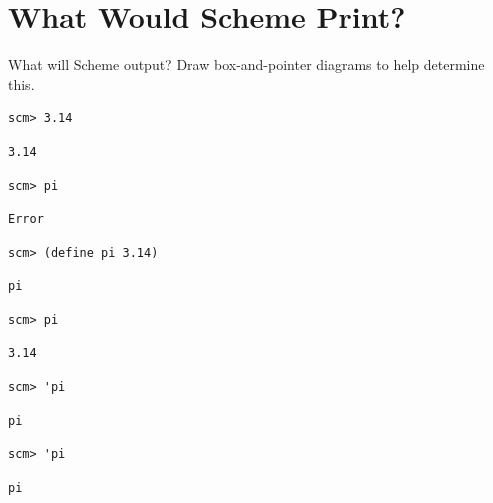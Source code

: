 \documentclass{exam}
\begin{document}
\section{What Would Scheme Print?}
\begin{questions}
\begin{blocksection}
\question What will Scheme output? Draw box-and-pointer diagrams to help determine this.

\begin{lstlisting}
scm> 3.14
\end{lstlisting}
\begin{solution}[0in]
\begin{lstlisting}
3.14
\end{lstlisting}
\end{solution}

\begin{lstlisting}
scm> pi
\end{lstlisting}
\begin{solution}[0in]
\begin{lstlisting}
Error
\end{lstlisting}
\end{solution}

\begin{lstlisting}
scm> (define pi 3.14)
\end{lstlisting}
\begin{solution}[0in]
\begin{lstlisting}
pi
\end{lstlisting}
\end{solution}

\begin{lstlisting}
scm> pi
\end{lstlisting}
\begin{solution}[.25in]
\begin{lstlisting}
3.14
\end{lstlisting}
\end{solution}

\begin{lstlisting}
scm> 'pi
\end{lstlisting}
\begin{solution}[.25in]
\begin{lstlisting}
pi
\end{lstlisting}
\end{solution}

\begin{lstlisting}
scm> 'pi
\end{lstlisting}
\begin{solution}[.25in]
\begin{lstlisting}
pi
\end{lstlisting}
\end{solution}
\end{blocksection}


\end{questions}
\end{document}
